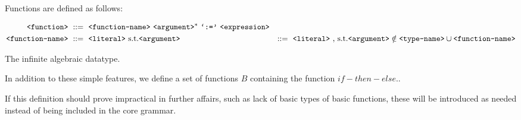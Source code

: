 Functions are defined as follows:

\begin{align}
\text{{\ttfamily<function>}}\ &::=\ \text{{\ttfamily<function-name>}}
\ \text{{\ttfamily<argument>}}^*\ \text{{\ttfamily`:='}}\ \text{{\ttfamily<expression>}}\\
\text{{\ttfamily<function-name>}}\ &::=\ \text{{\ttfamily<literal>}}\ \text{s.t.} 
\text{{\ttfamily<argument>}}\ &::=\ \text{{\ttfamily<literal>}}\ \text{, s.t.}\text{{\ttfamily<argument>}}\notin{\ensuremath{\text{{\ttfamily<type-name>}}}\cup\ensuremath{\text{{\ttfamily<function-name>}}}}
\end{align}

The infinite algebraic datatype.


In addition to these simple features, we define a set of functions $B$
containing the function $if-then-else$..

If this definition should prove impractical in further affairs, such as lack of
basic types of basic functions, these will be introduced as needed instead of
being included in the core grammar.
